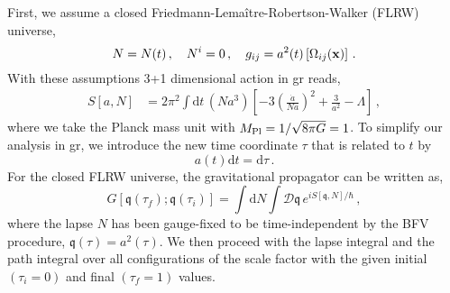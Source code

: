 \documentclass[superscriptaddress,aps,preprintnumbers,nofootinbib]{revtex4-2}
\begin{document}
First, we assume a closed Friedmann-Lema\^{i}tre-Robertson-Walker (FLRW) universe, 
\begin{equation}
 N = N(t)\,, \quad N^i = 0\,, \quad g_{ij} = a^2(t) \left[\Omega_{ij} ({\bf x}) \right]\,.
\end{equation}
With these assumptions 3+1 dimensional action in \ac{gr} reads, 
\begin{align}
S\left[a,N\right] &=  2\pi^2 \int \mathrm{d} t\, 
\left({Na^3}\right) \left[-3\left(\frac{\dot{a}}{Na}\right)^{2}
              + \frac{3}{a^2}-\Lambda \right]\,,
\end{align}
where we take the Planck mass unit with $M_{\rm Pl}=1/\sqrt{8\pi G}=1$. To simplify our analysis in \ac{gr}, we introduce the new time coordinate $\tau$ that is related to $t$ by  
\begin{equation}\label{new-time-gr}
 a(t) \mathrm{d}t=\mathrm{d}\tau \,.
\end{equation}
For the closed FLRW universe, the gravitational propagator can be written as,
\begin{equation}\label{gr-propagator}
 G\left[\mathfrak{q}(\tau_f);\mathfrak{q}(\tau_i)\right] = \int \mathrm{d}N
 \int
\mathcal{D}\mathfrak{q}  \, e^{iS\left[\mathfrak{q},N\right] / \hbar} \,,
 \end{equation}  
where the lapse $N$ has been gauge-fixed to be time-independent by the BFV procedure, $\mathfrak{q}(\tau)=a^2(\tau)$. We then proceed with the lapse integral and the path integral over all configurations of the scale factor with the given initial $(\tau_i=0)$ and final $(\tau_f=1)$ values.
\end{document}
